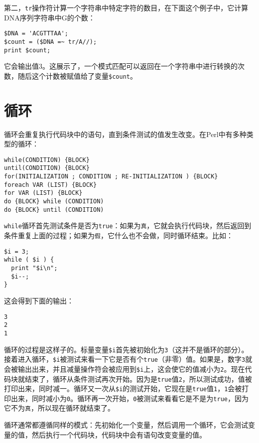 第二，\verb|tr|操作符计算一个字符串中特定字符的数目，在下面这个例子中，它计算DNA序列字符串中G的个数：

\begin{lstlisting}
$DNA = 'ACGTTTAA';
$count = ($DNA =~ tr/A//);
print $count;
\end{lstlisting}

它会输出值3。这展示了，一个模式匹配可以返回在一个字符串中进行转换的次数，随后这个计数被赋值给了变量\verb|$count|。

\section{循环}
循环会重复执行代码块中的语句，直到条件测试的值发生改变。在Perl中有多种类型的循环：

\begin{lstlisting}
while(CONDITION) {BLOCK}
until(CONDITION) {BLOCK}
for(INITIALIZATION ; CONDITION ; RE-INITIALIZATION ) {BLOCK}
foreach VAR (LIST) {BLOCK}
for VAR (LIST) {BLOCK}
do {BLOCK} while (CONDITION)
do {BLOCK} until (CONDITION)
\end{lstlisting}

\verb|while|循环首先测试条件是否为\verb|true|：如果为\verb|真|，它就会执行代码块，然后返回到条件重复上面的过程；如果为\verb|假|，它什么也不会做，同时循环结束。比如：

\begin{lstlisting}
$i = 3;
while ( $i ) {
  print "$i\n";
  $i--;
}
\end{lstlisting}

这会得到下面的输出：

\begin{lstlisting}
3
2
1
\end{lstlisting}

循环的过程是这样子的。标量变量\verb|$i|首先被初始化为\verb|3|（这并不是循环的部分）。接着进入循环，\verb|$i|被测试来看一下它是否有个\verb|true|（非零）值。如果是，数字\verb|3|就会被输出出来，并且减量操作符会被应用到\verb|$i|上，这会使它的值减小为\verb|2|。现在代码块就结束了，循环从条件测试再次开始。因为是\verb|true|值\verb|2|，所以测试成功，值被打印出来，同时减一。循环又一次从\verb|$i|的测试开始，它现在是\verb|true|值\verb|1|，\verb|1|会被打印出来，同时减小为\verb|0|。循环再一次开始，\verb|0|被测试来看看它是不是为\verb|true|，因为它不为\verb|真|，所以现在循环就结束了。

循环通常都遵循同样的模式：先初始化一个变量，然后调用一个循环，它会测试变量的值，然后执行一个代码块，代码块中会有语句改变变量的值。

